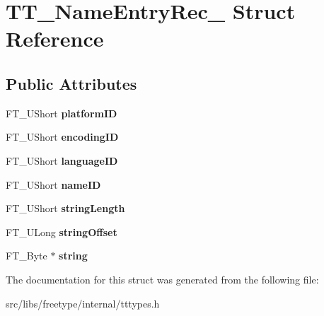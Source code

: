 \hypertarget{struct_t_t___name_entry_rec__}{
\section{TT\_\-NameEntryRec\_\- Struct Reference}
\label{struct_t_t___name_entry_rec__}
}
\subsection*{Public Attributes}
\begin{DoxyCompactItemize}
\item 
\hypertarget{struct_t_t___name_entry_rec___a9d4ee8bc42ed087f4533b6f664c0f6c6}{
FT\_\-UShort {\bfseries platformID}}
\label{struct_t_t___name_entry_rec___a9d4ee8bc42ed087f4533b6f664c0f6c6}

\item 
\hypertarget{struct_t_t___name_entry_rec___a8e7403a2f37c7f7fdb3c19e9549d315c}{
FT\_\-UShort {\bfseries encodingID}}
\label{struct_t_t___name_entry_rec___a8e7403a2f37c7f7fdb3c19e9549d315c}

\item 
\hypertarget{struct_t_t___name_entry_rec___a2ec03c0ff0c542f403b45a515bb20afb}{
FT\_\-UShort {\bfseries languageID}}
\label{struct_t_t___name_entry_rec___a2ec03c0ff0c542f403b45a515bb20afb}

\item 
\hypertarget{struct_t_t___name_entry_rec___abdaaec01d6620b3801f233cde5964548}{
FT\_\-UShort {\bfseries nameID}}
\label{struct_t_t___name_entry_rec___abdaaec01d6620b3801f233cde5964548}

\item 
\hypertarget{struct_t_t___name_entry_rec___a736e5f8caeada86cc33f62acca6537f5}{
FT\_\-UShort {\bfseries stringLength}}
\label{struct_t_t___name_entry_rec___a736e5f8caeada86cc33f62acca6537f5}

\item 
\hypertarget{struct_t_t___name_entry_rec___a33ed41d4d3c4fffa74193f3b52e11870}{
FT\_\-ULong {\bfseries stringOffset}}
\label{struct_t_t___name_entry_rec___a33ed41d4d3c4fffa74193f3b52e11870}

\item 
\hypertarget{struct_t_t___name_entry_rec___aefa752d5c88149f8e64122e14855d831}{
FT\_\-Byte $\ast$ {\bfseries string}}
\label{struct_t_t___name_entry_rec___aefa752d5c88149f8e64122e14855d831}

\end{DoxyCompactItemize}


The documentation for this struct was generated from the following file:\begin{DoxyCompactItemize}
\item 
src/libs/freetype/internal/tttypes.h\end{DoxyCompactItemize}
